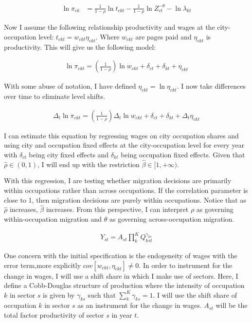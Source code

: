 \documentclass[10pt]{article}
\begin{document}
\begin{align*}
    \ln \pi_{ck} & = \frac{1}{1 - \rho} \ln t_{ckt} - \frac{1}{1 - \rho} \ln Z_{ct}^{- \theta} - \ln \lambda_{kt}
\end{align*}

Now I assume the following relationship productivity and wages at the city-occupation level: $t_{ckt} = w_{ckt} \eta_{ckt}$. Where $w_{ckt}$ are pages paid and $\eta_{ckt}$ is productivity. This will give us the following model:

\begin{align*}
    \ln \pi_{ckt} = \left( \frac{1}{1 - \rho} \right) \ln w_{ckt} + \delta_{ct} + \delta_{kt} + \eta_{ckt}
\end{align*}

With some abuse of notation, I have defined $\eta_{ckt} = \ln \eta_{ckt}$. I now take differences over time to eliminate level shifts.

\begin{align*}
    \Delta_t \ln \pi_{ckt} = \left( \frac{1}{1 - \rho} \right) \Delta_t \ln w_{ckt} + \delta_{ct} + \delta_{kt} + \Delta_t \eta_{ckt}
\end{align*}

I can estimate this equation by regressing wages on city occupation shares and using city and occupation fixed effects at the city-occupation level for every year with $\delta_{ct}$ being city fixed effects and $\delta_{kt}$ being occupation fixed effects. Given that $\hat{\rho} \in (0, 1)$, I will end up with the restriction $\hat{\beta} \in [1, +\infty)$.

With this regression, I are testing whether migration decisions are primarily within occupations rather than across occupations. If the correlation parameter is close to 1, then migration decisions are purely within occupations. Notice that as $\hat{\rho}$ increases, $\hat{\beta}$ increases. From this perspective, I can interpret $\rho$ as governing within-occupation migration and $\theta$ as governing across-occupation migration.

\begin{align*}
    Y_{st} = A_{st} \prod_{k}^{K} Q_{kst}^{\gamma_{ks}}
\end{align*}

One concern with the initial specification is the endogeneity of wages with the error term,more explicitly $cov[w_{ckt}, \eta_{ckt}] \neq 0$. In order to instrument for the change in wages, I will use a shift share in which I make use of sectors. Here, I define a Cobb-Douglas structure of production where the intensity of occupation $k$ in sector $s$ is given by $\gamma_{ks}$ such that $\sum_{k}^{K} \gamma_{ks} = 1$. I will use the shift share of occupation $k$ in sector $s$ as an instrument for the change in wages. $A_{st}$ will be the total factor productivity of sector $s$ in year $t$.
\end{document}

